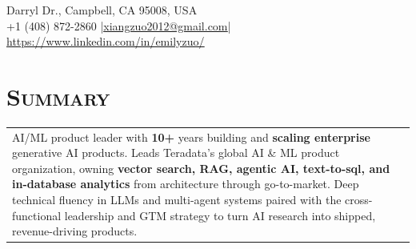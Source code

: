 \documentclass[letterpaper,11pt]{article} %
\begin{document}
\pagestyle{empty} %


\vspace*{-8mm}
\par{\par} %

 Darryl Dr., Campbell, CA 95008, USA\\
    +1 (408) 872-2860 \hspace{2 mm}|\hspace{2 mm}\href{mailto:xiangzuo2012@gmail.com}{\underline{xiangzuo2012@gmail.com}}\hspace{2 mm}|\hspace{2mm}\href{https://www.linkedin.com/in/emilyzuo/}{ \hspace{1 mm}\underline{https://www.linkedin.com/in/emilyzuo/}}

\section{\Large\bf\textsc{Summary}}
\begin{tabular}{p{18.5cm}}
AI/ML product leader with \textbf{10+} years building and \textbf{scaling enterprise} generative AI products. Leads Teradata's global AI \& ML product organization, owning \textbf{vector search, RAG, agentic AI, text-to-sql, and in-database analytics} from architecture through go-to-market. Deep technical fluency in LLMs and multi-agent systems paired with the cross-functional leadership and GTM strategy to turn AI research into shipped, revenue-driving products.
\end{tabular}
\vspace{-1mm}
\end{document}
